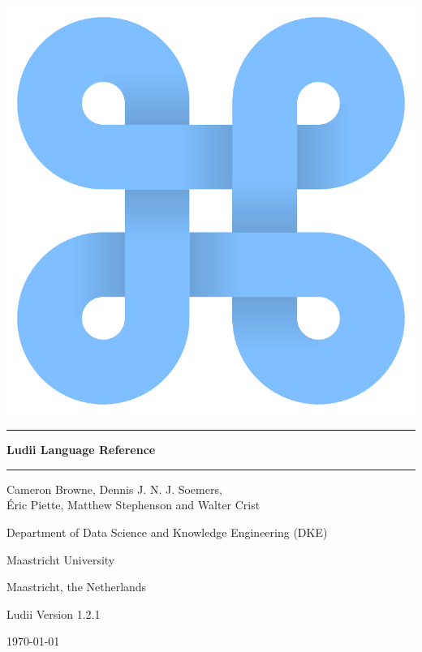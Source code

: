 \documentclass[10pt,twoside]{report}
\begin{document}
\texttt{\hyphenchar{} }

\thispagestyle{empty}

\begin{centering}

\includegraphics[scale=0.35]{figs/ludii-icon-1.pdf}


\vspace{30mm}
\noindent\rule{14.5cm}{0.5pt}

\vspace{5mm}
{\Huge \bf Ludii Language Reference}

\vspace{2mm}
\noindent\rule{14.5cm}{0.5pt}
 
 
\vspace{10mm}
{\Large Cameron Browne, Dennis J. N. J. Soemers,\\ {\'E}ric Piette, Matthew Stephenson and Walter Crist}

\vspace{10mm}
{\large Department of Data Science and Knowledge Engineering (DKE)}
 
\vspace{1mm}
{\large Maastricht University}

\vspace{1mm}
{\large Maastricht, the Netherlands}

\vspace{10mm}
{\large Ludii Version 1.2.1}

\vspace{1mm}
{\large \today}

\pagebreak

\end{centering}
\end{document}
